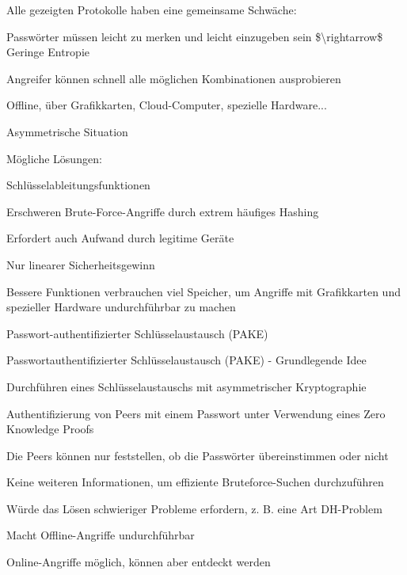 \documentclass[a4paper]{article}
\begin{document}
\begin{multicols}{3}
      \begin{itemize*}
            \item Alle gezeigten Protokolle haben eine gemeinsame Schwäche:
            \begin{itemize*}
                  \item Passwörter müssen leicht zu merken und leicht einzugeben sein \$\textbackslash rightarrow\$ Geringe Entropie
                  \item Angreifer können schnell alle möglichen Kombinationen ausprobieren
                  \item Offline, über Grafikkarten, Cloud-Computer, spezielle Hardware...
                  \item Asymmetrische Situation
            \end{itemize*}
            \item Mögliche Lösungen:
            \begin{itemize*}
                  \item Schlüsselableitungsfunktionen
                  \begin{itemize*} \item Erschweren Brute-Force-Angriffe durch extrem häufiges Hashing \item Erfordert auch Aufwand durch legitime Geräte \item Nur linearer Sicherheitsgewinn \item Bessere Funktionen verbrauchen viel Speicher, um Angriffe mit Grafikkarten und spezieller Hardware undurchführbar zu machen \end{itemize*}
                  \item Passwort-authentifizierter Schlüsselaustausch (PAKE)
            \end{itemize*}
            \item Passwortauthentifizierter Schlüsselaustausch (PAKE) - Grundlegende
            Idee
            \begin{itemize*}
                  \item Durchführen eines Schlüsselaustauschs mit asymmetrischer Kryptographie
                  \item Authentifizierung von Peers mit einem Passwort unter Verwendung eines Zero Knowledge Proofs
                  \item Die Peers können nur feststellen, ob die Passwörter übereinstimmen oder nicht
                  \item Keine weiteren Informationen, um effiziente Bruteforce-Suchen durchzuführen
                  \begin{itemize*} \item Würde das Lösen schwieriger Probleme erfordern, z. B. eine Art DH-Problem \item Macht Offline-Angriffe undurchführbar \end{itemize*}
                  \item Online-Angriffe möglich, können aber entdeckt werden
            \end{itemize*}
      \end{itemize*}



\end{multicols}
\end{document}
